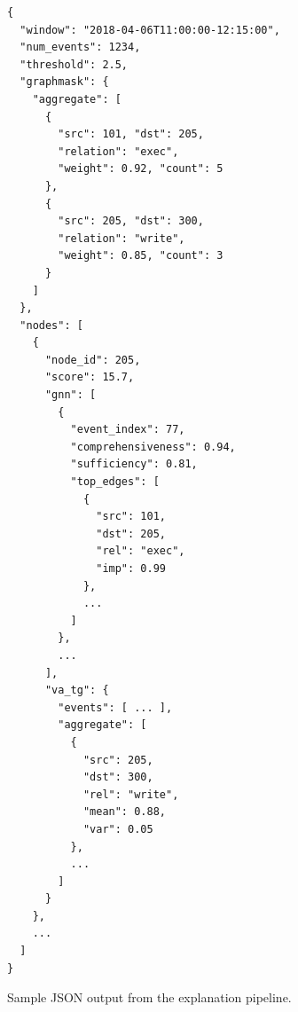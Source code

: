\documentclass[conference]{IEEEtran}
\begin{document}
\begin{figure}[htbp]
\centering
\begin{lrbox}{\jsonbox}
\begin{minipage}{0.95\linewidth}
\scriptsize
\begin{verbatim}
{
  "window": "2018-04-06T11:00:00-12:15:00",
  "num_events": 1234,
  "threshold": 2.5,
  "graphmask": {
    "aggregate": [
      {
        "src": 101, "dst": 205, 
        "relation": "exec", 
        "weight": 0.92, "count": 5
      },
      {
        "src": 205, "dst": 300, 
        "relation": "write", 
        "weight": 0.85, "count": 3
      }
    ]
  },
  "nodes": [
    {
      "node_id": 205,
      "score": 15.7,
      "gnn": [
        {
          "event_index": 77, 
          "comprehensiveness": 0.94, 
          "sufficiency": 0.81,
          "top_edges": [ 
            {
              "src": 101, 
              "dst": 205,
              "rel": "exec",
              "imp": 0.99
            },
            ... 
          ] 
        },
        ...
      ],
      "va_tg": {
        "events": [ ... ],
        "aggregate": [ 
          {
            "src": 205, 
            "dst": 300,
            "rel": "write",
            "mean": 0.88, 
            "var": 0.05
          }, 
          ... 
        ]
      }
    },
    ...
  ]
}
\end{verbatim}
\end{minipage}
\end{lrbox}
\fbox{\usebox{\jsonbox}}
\caption{Sample JSON output from the explanation pipeline.}
\end{figure}
\end{document}
